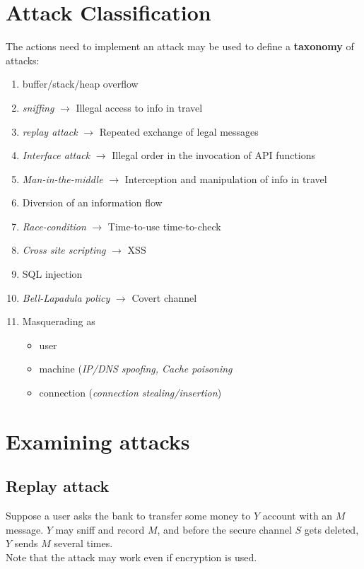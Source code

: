 \section{Attack Classification}
\label{sec:attack_taxonomy}
The actions need to implement an attack may be used to define a \textbf{taxonomy} of attacks:
\begin{enumerate}
    \item buffer/stack/heap overflow
    \item \textit{sniffing} $\rightarrow$ Illegal access to info in travel
    \item \textit{replay attack} $\rightarrow$ Repeated exchange of legal messages 
    \item \textit{Interface attack} $\rightarrow$ Illegal order in the invocation of API functions
    \item \textit{Man-in-the-middle} $\rightarrow$ Interception and manipulation of info in travel
    \item Diversion of an information flow
    \item \textit{Race-condition} $\rightarrow$ Time-to-use time-to-check
    \item \textit{Cross site scripting} $\rightarrow$  XSS
    \item SQL injection
    \item \textit{Bell-Lapadula policy} $\rightarrow$ Covert channel 
    \item Masquerading as
    \begin{itemize}
        \item user
        \item machine (\textit{IP/DNS spoofing, Cache poisoning}
        \item connection (\textit{connection stealing/insertion})
    \end{itemize}
\end{enumerate}

\section{Examining attacks}
\subsection*{Replay attack}
Suppose a user asks the bank to transfer some money to $Y$ account with an $M$ message.
$Y$ may sniff and record $M$, and before the secure channel $S$ gets deleted, $Y$ sends $M$ several times.\\
Note that the attack may work even if encryption is used.

